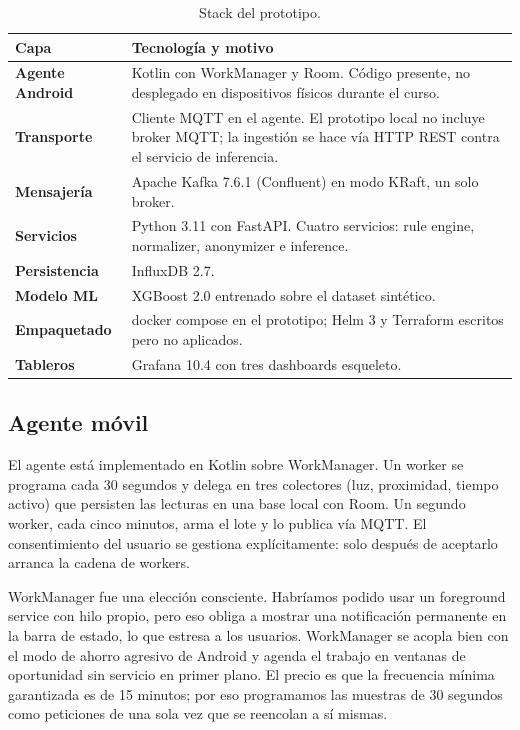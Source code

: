 \documentclass[conference]{IEEEtran}
\begin{document}
\begin{table}[H]
  \centering
  \caption{Stack del prototipo.}
  \label{tab:stack}
  \begin{tabularx}{\linewidth}{@{}>{\bfseries}p{2.4cm} X@{}}
    \toprule
    Capa & Tecnología y motivo \\
    \midrule
    Agente Android & Kotlin con WorkManager y Room. Código presente,
              no desplegado en dispositivos físicos durante el curso. \\
    Transporte & Cliente MQTT en el agente. El prototipo local
              no incluye broker MQTT; la ingestión se hace vía HTTP
              REST contra el servicio de inferencia. \\
    Mensajería & Apache Kafka 7.6.1 (Confluent) en modo KRaft, un solo
              broker. \\
    Servicios & Python 3.11 con FastAPI. Cuatro servicios:
              rule engine, normalizer, anonymizer e inference. \\
    Persistencia & InfluxDB 2.7. \\
    Modelo ML & XGBoost 2.0 entrenado sobre el dataset sintético. \\
    Empaquetado & docker compose en el prototipo;
              Helm 3 y Terraform escritos pero no aplicados. \\
    Tableros & Grafana 10.4 con tres dashboards esqueleto. \\
    \bottomrule
  \end{tabularx}
\end{table}

\subsection{Agente móvil}

El agente está implementado en Kotlin sobre WorkManager. Un worker se 
programa cada 30 segundos y delega en tres colectores (luz, 
proximidad, tiempo activo) que persisten las lecturas en una base 
local con Room. Un segundo worker, cada cinco minutos, arma el lote 
y lo publica vía MQTT. El consentimiento del usuario se gestiona 
explícitamente: solo después de aceptarlo arranca la cadena de 
workers.

WorkManager fue una elección consciente. Habríamos podido usar un 
foreground service con hilo propio, pero eso obliga a mostrar una 
notificación permanente en la barra de estado, lo que estresa a los 
usuarios. WorkManager se acopla bien con el modo de ahorro agresivo 
de Android y agenda el trabajo en ventanas de oportunidad sin 
servicio en primer plano. El precio es que la frecuencia mínima 
garantizada es de 15 minutos; por eso programamos las muestras de 
30 segundos como peticiones de una sola vez que se reencolan a sí 
mismas.
\end{document}
